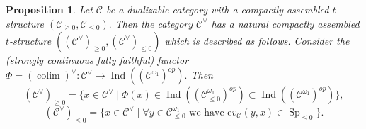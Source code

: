 \documentclass[11pt,leqno]{amsart}
\newtheorem{prop}[theo]{Proposition}
\numberwithin{equation}{section}
\DeclareMathOperator*{\colim}{colim}
\newcommand{\ev}{\mathrm ev}
\newcommand{\cC}{{\mathcal C}}
\newcommand{\Sp}{\operatorname{Sp}}
\newcommand{\Ind}{\operatorname{Ind}}
\begin{document}
\begin{prop}\label{prop:dual_t_structure}
Let $\cC$ be a dualizable category with a compactly assembled $t$-structure $(\cC_{\geq 0},\cC_{\leq 0}).$ Then the category $\cC^{\vee}$ has a natural compactly assembled $t$-structure $((\cC^{\vee})_{\geq 0},(\cC^{\vee})_{\leq 0})$ which is described as follows. Consider the (strongly continuous fully faithful) functor $\Phi=(\colim)^{\vee}:\cC^{\vee}\to\Ind((\cC^{\omega_1})^{op}).$ Then 
\begin{equation*}\label{eq:C_vee_geq_0}
(\cC^{\vee})_{\geq 0}=\{x\in\cC^{\vee}\mid \Phi(x)\in \Ind((\cC^{\omega_1}_{\leq 0})^{op})\subset\Ind((\cC^{\omega_1})^{op})\},
\end{equation*}
\begin{equation*}\label{eq:C_vee_leq_0}
(\cC^{\vee})_{\leq 0}=\{x\in\cC^{\vee}\mid \forall y\in\cC^{\omega_1}_{\leq 0}\text{ we have }\ev_{\cC}(y,x)\in\Sp_{\leq 0}\}.
\end{equation*}
\end{prop}
\end{document}
